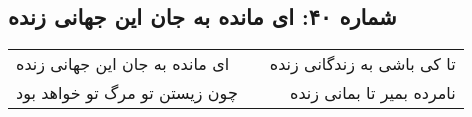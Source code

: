 \begin{center}
\section*{شماره ۴۰: ای مانده به جان این جهانی زنده}
\label{sec:040}
\begin{longtable}{l p{0.5cm} r}
ای مانده به جان این جهانی زنده
&&
تا کی باشی به زندگانی زنده
\\
چون زیستن تو مرگ تو خواهد بود
&&
نامرده بمیر تا بمانی زنده
\\
\end{longtable}
\end{center}
